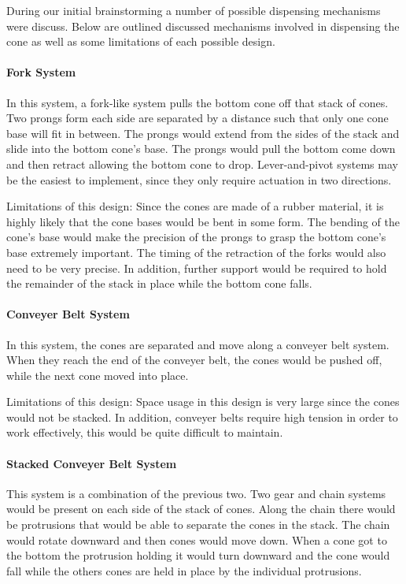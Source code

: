 \documentclass[11pt]{report}
\newenvironment{indpar}[1]%
{\begin{list}{}%
         {\setlength{\leftmargin}{#1}}%
         \item[]%
}
{\end{list}}
\begin{document}
During our initial brainstorming a number of possible dispensing mechanisms were discuss. Below are outlined discussed mechanisms involved in dispensing the cone as well as some limitations of each possible design.

\paragraph{Fork System}
In this system, a fork-like system pulls the bottom cone off that stack of cones. Two prongs form each side are separated by a distance such that only one cone base will fit in between. The prongs would extend from the sides of the stack and slide into the bottom cone's base. The prongs would pull the bottom come down and then retract allowing the bottom cone to drop. Lever-and-pivot systems may be the easiest to implement, since they only require actuation in two directions.

\begin{indpar}{1cm}
Limitations of this design: Since the cones are made of a rubber material, it is highly likely that the cone bases would be bent in some form. The bending of the cone's base would make the precision of the prongs to grasp the bottom cone's base extremely important. The timing of the retraction of the forks would also need to be very precise. In addition, further support would be required to hold the remainder of the stack in place while the bottom cone falls.
\end{indpar}

\paragraph{Conveyer Belt System}
In this system, the cones are separated and move along a conveyer belt system. When they reach the end of the conveyer belt, the cones would be pushed off, while the next cone moved into place.

\begin{indpar}{1cm}
Limitations of this design:
Space usage in this design is very large since the cones would not be stacked. In addition, conveyer belts require high tension in order to work effectively, this would be quite difficult to maintain.
\end{indpar}

\paragraph{Stacked Conveyer Belt System}
This system is a combination of the previous two. Two gear and chain systems would be present on each side of the stack of cones. Along the chain there would be protrusions that would be able to separate the cones in the stack. The chain would rotate downward and then cones would move down. When a cone got to the bottom the protrusion holding it would turn downward and the cone would fall while the others cones are held in place by the individual protrusions.
\end{document}
